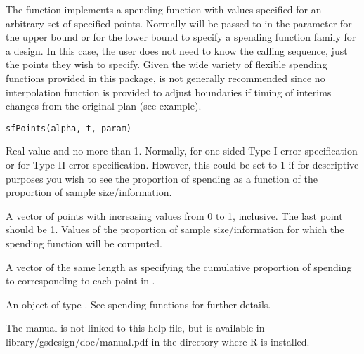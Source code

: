 \begin{Description}\relax
The function  implements a spending function with values specified for an arbitrary set of specified points.
Normally  will be passed to  in the parameter  for the upper bound or
 for the lower bound to specify a spending function family for a design.
In this case, the user does not need to know the calling sequence, just the points they wish to specify.
Given the wide variety of flexible spending functions provided in this package,  is not generally recommended
since no interpolation function is provided to adjust boundaries if timing of interims changes from the original plan (see example).
\end{Description}
\begin{Usage}
\begin{verbatim}
sfPoints(alpha, t, param)
\end{verbatim}
\end{Usage}
\begin{Arguments}
\begin{ldescription}
\item[\code{alpha}] Real value  and no more than 1. Normally,  for one-sided Type I error specification
or  for Type II error specification. However, this could be set to 1 if for descriptive purposes
you wish to see the proportion of spending as a function of the proportion of sample size/information.
\item[\code{t}] A vector of points with increasing values from 0 to 1, inclusive. The last point should be 1.
Values of the proportion of sample size/information for which the spending function will be computed.
\item[\code{param}] A vector of the same length as  specifying the cumulative proportion of spending
to corresponding to each point in .
\end{ldescription}
\end{Arguments}
\begin{Value}
An object of type . See spending functions for further details.
\end{Value}
\begin{Note}\relax
The manual is not linked to this help file, but is available in library/gsdesign/doc/manual.pdf
in the directory where R is installed.
\end{Note}
